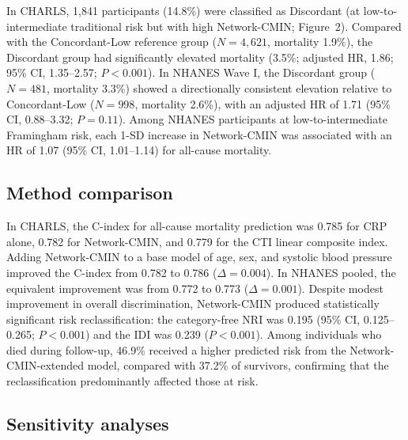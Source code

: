 \documentclass[11pt,a4paper]{article}
\begin{document}
In CHARLS, 1,841 participants (14.8\%) were classified as Discordant (at low-to-intermediate traditional risk but with high Network-CMIN; Figure~2). Compared with the Concordant-Low reference group ($N = 4{,}621$, mortality 1.9\%), the Discordant group had significantly elevated mortality (3.5\%; adjusted HR, 1.86; 95\% CI, 1.35--2.57; $P < 0.001$). In NHANES Wave I, the Discordant group ($N = 481$, mortality 3.3\%) showed a directionally consistent elevation relative to Concordant-Low ($N = 998$, mortality 2.6\%), with an adjusted HR of 1.71 (95\% CI, 0.88--3.32; $P = 0.11$). Among NHANES participants at low-to-intermediate Framingham risk, each 1-SD increase in Network-CMIN was associated with an HR of 1.07 (95\% CI, 1.01--1.14) for all-cause mortality.

\subsection{Method comparison}

In CHARLS, the C-index for all-cause mortality prediction was 0.785 for CRP alone, 0.782 for Network-CMIN, and 0.779 for the CTI linear composite index. Adding Network-CMIN to a base model of age, sex, and systolic blood pressure improved the C-index from 0.782 to 0.786 ($\Delta = 0.004$). In NHANES pooled, the equivalent improvement was from 0.772 to 0.773 ($\Delta = 0.001$). Despite modest improvement in overall discrimination, Network-CMIN produced statistically significant risk reclassification: the category-free NRI was 0.195 (95\% CI, 0.125--0.265; $P < 0.001$) and the IDI was 0.239 ($P < 0.001$). Among individuals who died during follow-up, 46.9\% received a higher predicted risk from the Network-CMIN-extended model, compared with 37.2\% of survivors, confirming that the reclassification predominantly affected those at risk.

\subsection{Sensitivity analyses}
\end{document}
